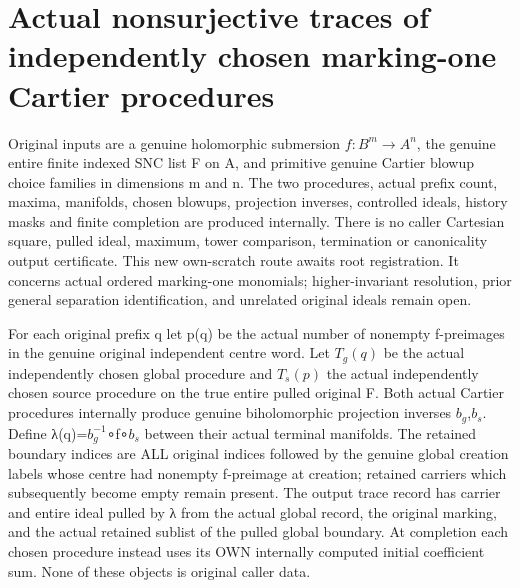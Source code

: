 \section{Actual nonsurjective traces of independently chosen marking-one Cartier procedures}
Original inputs are a genuine holomorphic submersion $f:B^m→A^n$, the genuine entire finite indexed SNC list F on A, and primitive genuine Cartier blowup choice families in dimensions m and n. The two procedures, actual prefix count, maxima, manifolds, chosen blowups, projection inverses, controlled ideals, history masks and finite completion are produced internally. There is no caller Cartesian square, pulled ideal, maximum, tower comparison, termination or canonicality output certificate. This new own-scratch route awaits root registration. It concerns actual ordered marking-one monomials; higher-invariant resolution, prior general separation identification, and unrelated original ideals remain open.

\begin{definition}
\label{hir:submersion-choice-image-trace-definition}
\leanok
{}

For each original prefix q let p(q) be the actual number of nonempty f-preimages in the genuine original independent centre word. Let $T_g(q)$ be the actual independently chosen global procedure and $T_s(p)$ the actual independently chosen source procedure on the true entire pulled original F. Both actual Cartier procedures internally produce genuine biholomorphic projection inverses $b_g$,$b_s$. Define λ(q)=$b_g^{-1}$∘f∘$b_s$ between their actual terminal manifolds. The retained boundary indices are ALL original indices followed by the genuine global creation labels whose centre had nonempty f-preimage at creation; retained carriers which subsequently become empty remain present. The output trace record has carrier and entire ideal pulled by λ from the actual global record, the original marking, and the actual retained sublist of the pulled global boundary. At completion each chosen procedure instead uses its OWN internally computed initial coefficient sum. None of these objects is original caller data.
\end{definition}

